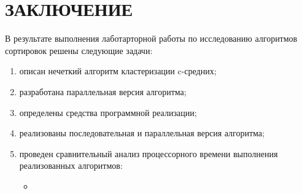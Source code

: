 \chapter*{ЗАКЛЮЧЕНИЕ}

В результате выполнения лаботарторной работы по исследованию алгоритмов сортировок решены следующие задачи:
\begin{enumerate}
	\item описан нечеткий алгоритм кластеризации c-средних;
	\item разработана параллельная версия алгоритма;
	\item определены средства программной реализации;
	\item реализованы последовательная и параллельная версия алгоритма;
	\item проведен сравнительный анализ процессорного времени выполнения реализованных алгоритмов:
	\begin{itemize}
		\item 
	\end{itemize}
\end{enumerate}